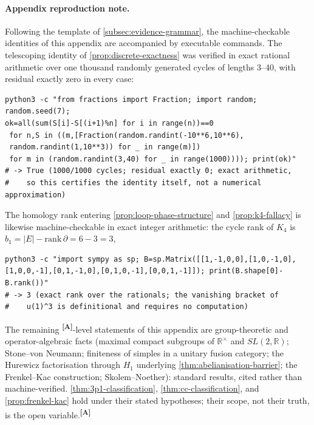 \documentclass[12pt,a4paper,twoside]{article}
\theoremstyle{plain}
\theoremstyle{definition}
\theoremstyle{remark}
\newcommand{\catmark}[1]{\textsuperscript{\textsf{\textbf{[#1]}}}}
\begin{document}
\paragraph{Appendix reproduction note.}
Following the template of \cref{subsec:evidence-grammar}, the
machine-checkable identities of this appendix are accompanied by
executable commands. The telescoping identity of \cref{prop:discrete-exactness} was
verified in exact rational arithmetic over one thousand randomly generated
cycles of lengths 3--40, with residual exactly zero in every case:
\begin{verbatim}
python3 -c "from fractions import Fraction; import random; random.seed(7);
ok=all(sum(S[i]-S[(i+1)%n] for i in range(n))==0
 for n,S in ((m,[Fraction(random.randint(-10**6,10**6),
 random.randint(1,10**3)) for _ in range(m)])
 for m in (random.randint(3,40) for _ in range(1000)))); print(ok)"
# -> True (1000/1000 cycles; residual exactly 0; exact arithmetic,
#    so this certifies the identity itself, not a numerical approximation)
\end{verbatim}
The homology rank entering \cref{prop:loop-phase-structure} and
\cref{prop:k4-fallacy} is likewise machine-checkable in exact integer
arithmetic: the cycle rank of $K_4$ is
$b_1=|E|-\mathrm{rank}\,\partial=6-3=3$,
\begin{verbatim}
python3 -c "import sympy as sp; B=sp.Matrix([[1,-1,0,0],[1,0,-1,0],
[1,0,0,-1],[0,1,-1,0],[0,1,0,-1],[0,0,1,-1]]); print(B.shape[0]-B.rank())"
# -> 3 (exact rank over the rationals; the vanishing bracket of
#    u(1)^3 is definitional and requires no computation)
\end{verbatim}
The remaining \catmark{A}-level statements of this appendix are
group-theoretic and operator-algebraic facts (maximal compact subgroups of
$\mathbb{R}^{\times}$ and $SL(2,\mathbb{R})$; Stone--von Neumann; finiteness
of simples in a unitary fusion category; the Hurewicz factorisation through
$H_1$ underlying \cref{thm:abelianisation-barrier}; the Frenkel--Kac
construction; Skolem--Noether): standard results, cited rather
than machine-verified. \cref{thm:3p1-classification},
\cref{thm:cc-classification}, and \cref{prop:frenkel-kac} hold under their
stated hypotheses; their scope, not their truth, is the open
variable.\catmark{A}

\newpage
\end{document}
